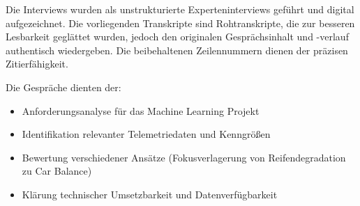 
Die Interviews wurden als unstrukturierte Experteninterviews geführt und digital aufgezeichnet. Die vorliegenden Transkripte sind Rohtranskripte, die zur besseren Lesbarkeit geglättet wurden, jedoch den originalen Gesprächsinhalt und -verlauf authentisch wiedergeben. Die beibehaltenen Zeilennummern dienen der präzisen Zitierfähigkeit.

Die Gespräche dienten der:
\begin{itemize}
 \item Anforderungsanalyse für das Machine Learning Projekt
 \item Identifikation relevanter Telemetriedaten und Kenngrößen
 \item Bewertung verschiedener Ansätze (Fokusverlagerung von Reifendegradation zu Car Balance)
 \item Klärung technischer Umsetzbarkeit und Datenverfügbarkeit
\end{itemize}